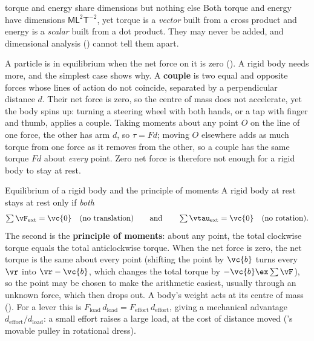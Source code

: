 \begin{trapbox}{torque and energy share dimensions but nothing else}
Both torque and energy have dimensions $\mathsf M\mathsf L^2\mathsf T^{-2}$, yet torque is a
\emph{vector} built from a cross product and energy is a \emph{scalar} built from a dot product. They may
never be added, and dimensional analysis () cannot tell them apart.
\end{trapbox}


A particle is in equilibrium when the net force on it is zero (). A rigid body needs
more, and the simplest case shows why. A \textbf{couple} is two equal and opposite forces whose lines of
action do not coincide, separated by a perpendicular distance $d$. Their net force is zero, so the centre of
mass does not accelerate, yet the body spins up: turning a steering wheel with both hands, or a tap with
finger and thumb, applies a couple. Taking moments about any point $O$ on the line of one force, the
other has arm $d$, so $\tau=Fd$; moving $O$ elsewhere adds as much torque from one force as it removes
from the other, so a couple has the same torque $Fd$ about \emph{every} point. Zero net force is
therefore not enough for a rigid body to stay at rest.

\begin{keybox}{Equilibrium of a rigid body and the principle of moments}
A rigid body at rest stays at rest only if \emph{both}
\[
\textstyle\sum\vF_{\text{ext}}=\vc{0}\quad\text{(no translation)}\qquad\text{and}\qquad
\sum\vtau_{\text{ext}}=\vc{0}\quad\text{(no rotation)}.
\]
The second is the \textbf{principle of moments}: about any point, the total clockwise torque equals the
total anticlockwise torque. When the net force is zero, the net torque is the same about every point
(shifting the point by $\vc{b}$ turns every $\vr$ into $\vr-\vc{b}$, which changes the total torque by $-\vc{b}\ex\sum\vF$), so the point may be
chosen to make the arithmetic easiest, usually through an unknown force, which then drops out. A body's
weight acts at its centre of mass (). For a lever this is
$F_{\text{load}}\,d_{\text{load}}=F_{\text{effort}}\,d_{\text{effort}}$, giving a mechanical advantage
$d_{\text{effort}}/d_{\text{load}}$: a small effort raises a large load, at the cost of distance moved
('s movable pulley in rotational dress).
\end{keybox}

